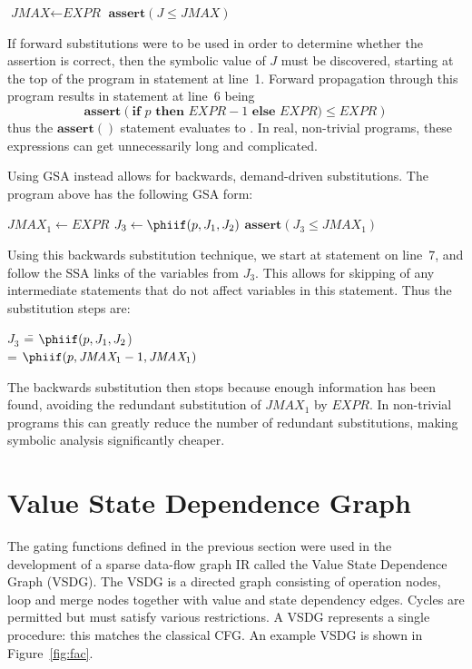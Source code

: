 {
  \def\Expr{\textit{EXPR}}
  \def\JMAX{\textit{JMAX}}
  \newcommand\assert[1]{\textbf{assert}\left(#1\right)}
  
\begin{algorithm}[H]
  $\JMAX\gets\Expr$\;
  \eIf{$p$}{
    $J\gets\JMAX-1$\;
  }{
    $J\gets\JMAX$\;
  }
  $\assert{J\leq \JMAX}$\;
\label{fig:tupaduaexample}
\end{algorithm}

If forward substitutions were to be used in order to determine whether the assertion is correct, then the symbolic value of $J$ must be discovered, starting at the top of the program in statement at line~1. 
Forward propagation through this program results in statement at line~6 being
$$\assert{\textbf{if } p \textbf{ then } \Expr-1 \textbf{ else }\Expr)\leq \Expr}$$
thus the $\assert{}$ statement evaluates to \true. 
In real, non-trivial programs, these expressions can get unnecessarily long and complicated.


Using GSA instead allows for backwards, demand-driven substitutions. The program above has the following GSA form:

\begin{algorithm}[H]
  $\JMAX_1\gets\Expr$\;
  \eIf{$p$}{
    $J_1\gets\JMAX_1-1$\;
  }{
    $J_2\gets\JMAX_1$\;
  }
  $J_3\gets\phiif(p,J_1,J_2)$\;
  $\assert{J_3\leq \JMAX_1}$\;
\label{fig:tupaduagsasubs}
\end{algorithm}

Using this backwards substitution technique, we start at statement on line~7, and follow the SSA links of the variables from $J_3$. 
This allows for skipping of any intermediate statements that do not affect variables in this statement. 
Thus the substitution steps are:

    \begin{tabbing}
        ${J_3}$ \= = $\phiif(p,J_1,J_2$)\\
        \> = $\phiif(p,\JMAX_1 - 1,\JMAX_1)$
    \end{tabbing}

The backwards substitution then stops because enough information has been found, avoiding the redundant substitution of $\JMAX_1$ by $\Expr$. 
In non-trivial programs this can greatly reduce the number of redundant substitutions, making symbolic analysis significantly cheaper.

\section{Value State Dependence Graph}
The gating functions defined in the previous section were used in the development of a sparse data-flow graph IR called the Value State Dependence Graph (VSDG). 
The VSDG is a directed graph consisting of operation nodes, loop and merge nodes together with value and state dependency edges. 
Cycles are permitted but must satisfy various restrictions. 
A VSDG represents a single procedure: 
this matches the classical CFG.
%
An example VSDG is shown in Figure~\ref{fig:fac}. 

}
